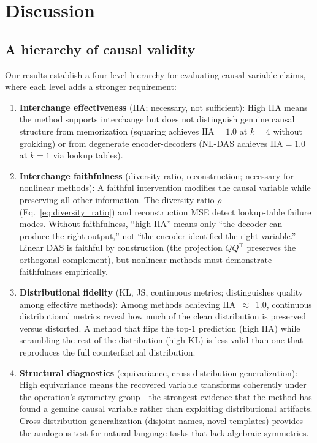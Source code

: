 \documentclass{article}
\newcommand{\IIA}{\mathrm{IIA}}
\begin{document}
\section{Discussion}
\label{sec:discussion}

\subsection{A hierarchy of causal validity}

Our results establish a four-level hierarchy for evaluating causal variable
claims, where each level adds a stronger requirement:

\begin{enumerate}
\item \textbf{Interchange effectiveness} (IIA; necessary, not sufficient): High
  IIA means the method supports interchange but does not distinguish genuine
  causal structure from memorization (squaring achieves $\IIA = 1.0$ at $k = 4$
  without grokking) or from degenerate encoder-decoders (NL-DAS achieves
  $\IIA = 1.0$ at $k = 1$ via lookup tables).

\item \textbf{Interchange faithfulness} (diversity ratio, reconstruction;
  necessary for nonlinear methods): A faithful intervention modifies the causal
  variable while preserving all other information. The diversity ratio
  $\rho$ (Eq.~\ref{eq:diversity_ratio}) and reconstruction MSE detect
  lookup-table failure modes. Without faithfulness, ``high IIA'' means only
  ``the decoder can produce the right output,'' not ``the encoder identified
  the right variable.'' Linear DAS is faithful by construction (the projection
  $QQ^\top$ preserves the orthogonal complement), but nonlinear methods must
  demonstrate faithfulness empirically.

\item \textbf{Distributional fidelity} (KL, JS, continuous metrics;
  distinguishes quality among effective methods): Among methods achieving
  IIA~$\approx$~1.0, continuous distributional metrics reveal how much of
  the clean distribution is preserved versus distorted. A method that flips
  the top-1 prediction (high IIA) while scrambling the rest of the distribution
  (high KL) is less valid than one that reproduces the full counterfactual
  distribution.

\item \textbf{Structural diagnostics} (equivariance, cross-distribution
  generalization): High equivariance means the recovered variable transforms
  coherently under the operation's symmetry group---the strongest evidence that
  the method has found a genuine causal variable rather than exploiting
  distributional artifacts. Cross-distribution generalization (disjoint names,
  novel templates) provides the analogous test for natural-language tasks that
  lack algebraic symmetries.
\end{enumerate}
\end{document}
